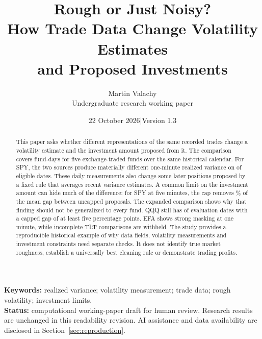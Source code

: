 \documentclass[11pt,a4paper]{article}
\title{\textbf{Rough or Just Noisy?}\\[6pt]\large How Trade Data Change Volatility Estimates\\and Proposed Investments}
\author{Martin Valachy\\\small Undergraduate research working paper}
\date{22 October 2026\quad |\quad Version 1.3}
\begin{document}
\maketitle
\begin{abstract}
This paper asks whether different representations of the same recorded trades change a volatility estimate and the investment amount proposed from it. The comparison covers  fund-days for five exchange-traded funds over the same historical calendar. For SPY, the two sources produce materially different one-minute realized variance on  of  eligible dates. These daily measurements also change some later positions proposed by a fixed rule that averages recent variance estimates. A common limit on the investment amount can hide much of the difference: for SPY at five minutes, the cap removes \% of the mean gap between uncapped proposals. The expanded comparison shows why that finding should not be generalized to every fund. QQQ still has  of  evaluation dates with a capped gap of at least five percentage points. EFA shows strong masking at one minute, while incomplete TLT comparisons are withheld. The study provides a reproducible historical example of why data fields, volatility measurements and investment constraints need separate checks. It does not identify true market roughness, establish a universally best cleaning rule or demonstrate trading profits.
\end{abstract}
\textbf{Keywords:} realized variance; volatility measurement; trade data; rough volatility; investment limits.\\
\textbf{Status:} computational working-paper draft for human review. Research results are unchanged in this readability revision. AI assistance and data availability are disclosed in Section~\ref{sec:reproduction}.
\clearpage

\clearpage
\tableofcontents
\clearpage

\clearpage


\clearpage\appendix
\end{document}
